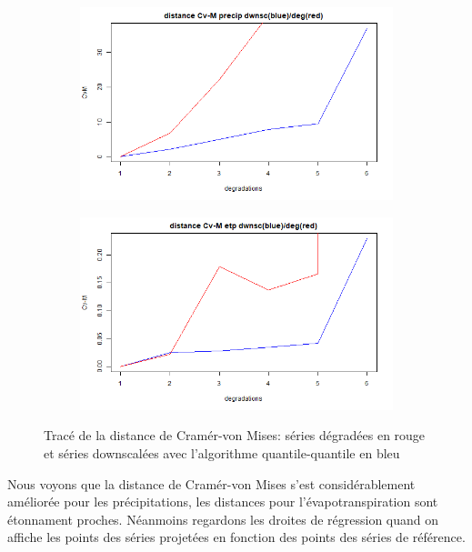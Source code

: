 \documentclass[a4paper,11pt]{article}
\numberwithin{equation}{section}
\begin{document}
\begin{figure}[H]
 	\label{fig-res_CVM_QQ}
 	\centering
 	\begin{subfigure}[b]{0.45\textwidth}
 		\includegraphics[scale=0.4]{images/Dist_CVM_precip_QQ.png}
 	\end{subfigure}
	\hfill
	\begin{subfigure}[b]{0.45\textwidth}
		\includegraphics[scale=0.4]{images/Dist_CVM_evap_QQ.png}
	\end{subfigure}
 	\caption{Tracé de la distance de Cramér-von Mises: séries dégradées en rouge et séries downscalées avec l'algorithme quantile-quantile en bleu}
\end{figure}

Nous voyons que la distance de Cramér-von Mises s'est considérablement améliorée pour les précipitations, les distances pour l'évapotranspiration sont étonnament proches. Néanmoins regardons les droites de régression quand on affiche les points des séries projetées en fonction des points des séries de référence. 
\end{document}
